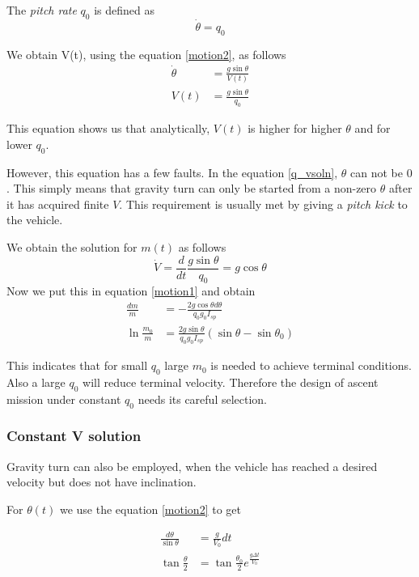 \documentclass{article}
\theoremstyle{definition}
\begin{document}
The \emph{pitch rate} $q_0$ is defined as 
\[\Dot{\theta} = q_0\]

We obtain V(t), using the equation \ref{motion2}, as follows
\begin{equation}\label{q_vsoln}
\begin{split}
    \Dot{\theta} & = \frac{g \sin{\theta}}{V(t)}\\
    V(t) & = \frac{g \sin{\theta}}{q_0}
\end{split}
\end{equation}

This equation shows us that analytically, $V(t)$ is higher for higher $\theta$ and for lower $q_0$.

However, this equation has a few faults. In the equation \ref{q_vsoln}, $\theta$ can not be $0$. This simply means that gravity turn can only be started from a non-zero $\theta$ after it has acquired finite $V$.
This requirement is usually met by giving a \emph{pitch kick} to the vehicle.

We obtain the solution for $m(t)$ as follows
\begin{equation}
    \Dot{V} = \frac{d}{dt} \frac{g \sin{\theta}}{q_0} = g\cos{\theta}
\end{equation}
Now we put this in equation \ref{motion1} and obtain
\begin{equation}
\begin{split}
    \frac{dm}{m} & = - \frac{2 g \cos{\theta} d\theta}{q_0 g_0 I_{sp}}\\
    \ln{\frac{m_0}{m}} & = \frac{2 g \sin{\theta}}{q_0 g_0 I_{sp}}(\sin{\theta} - \sin{\theta_0})
\end{split}
\end{equation}

This indicates that for small $q_0$ large $m_0$ is needed to achieve terminal conditions. 
Also a large $q_0$ will reduce terminal velocity. 
Therefore the design of ascent mission under constant $q_0$ needs its careful selection.

\subsubsection{Constant V solution}

Gravity turn can also be employed, when the vehicle has reached a desired velocity but does not have inclination.

For $\theta(t)$ we use the equation \ref{motion2} to get

\begin{equation}\label{v_theta.const}
\begin{split}
    \frac{d\theta}{\sin{\theta}} & = \frac{g}{V_0} dt\\
    \tan{\frac{\theta}{2}} & = \tan{\frac{\theta_0}{2}} e^{\frac{g \Delta t}{V_0}}
\end{split}
\end{equation}
\end{document}
